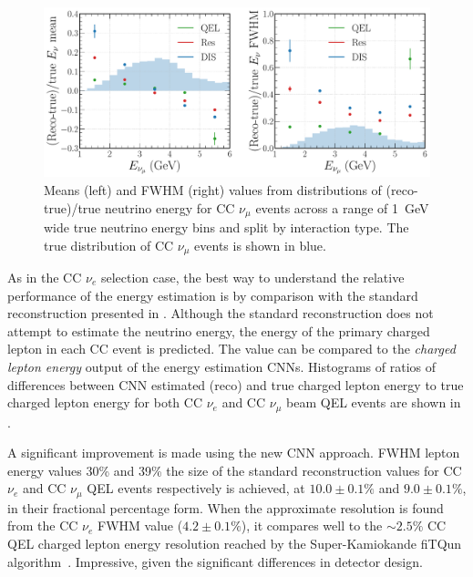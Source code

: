 \begin{figure} %
    \includegraphics[width=\textwidth]{diagrams/7-results/final_energy_numu.pdf}
    \caption[Means and FWHM values of $\nu_{\mu}$ energy distributions]
    {Means (left) and FWHM (right) values from distributions of (reco-true)/true neutrino energy
        for CC $\nu_{\mu}$ events across a range of \SI{1}{GeV} wide true neutrino energy bins and
        split by interaction type. The true distribution of CC $\nu_{\mu}$ events is shown in
        blue.}
    \label{fig:final_energy_numu}
\end{figure}

As in the CC $\nu_{e}$ selection case, the best way to understand the relative performance of the
energy estimation is by comparison with the standard \chips reconstruction presented in
. Although the standard reconstruction does not attempt to estimate
the neutrino energy, the energy of the primary charged lepton in each CC event is predicted. The
value can be compared to the \emph{charged lepton energy} output of the energy estimation CNNs.
Histograms of ratios of differences between CNN estimated (reco) and true charged lepton energy to
true charged lepton energy for both CC $\nu_{e}$ and CC $\nu_{\mu}$ beam QEL events are shown in
.

A significant improvement is made using the new CNN approach. FWHM lepton energy values 30\% and
39\% the size of the standard reconstruction values for CC $\nu_{e}$ and CC $\nu_{\mu}$ QEL events
respectively is achieved, at $10.0\pm0.1\%$ and $9.0\pm0.1\%$, in their fractional percentage
form. When the approximate resolution is found from the CC $\nu_{e}$ FWHM value ($4.2\pm0.1\%$),
it compares well to the $\sim2.5\%$ CC QEL charged lepton energy resolution reached by the
Super-Kamiokande fiTQun algorithm~\cite{jiang2019}. Impressive, given the significant differences
in detector design.

